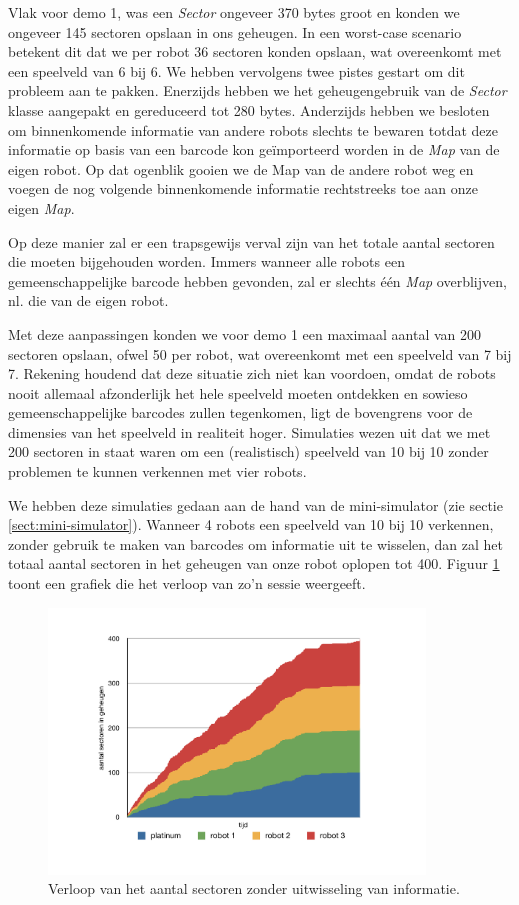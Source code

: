 \documentclass[12pt,a4paper]{report}
\begin{document}
Vlak voor demo 1, was een \emph{Sector} ongeveer 370 bytes groot en konden we ongeveer 145 sectoren opslaan in ons geheugen. In een worst-case scenario betekent dit dat we per robot 36 sectoren konden opslaan, wat overeenkomt met een speelveld van 6 bij 6. We hebben vervolgens twee pistes gestart om dit probleem aan te pakken. Enerzijds hebben we het geheugengebruik van de \emph{Sector} klasse aangepakt en gereduceerd tot 280 bytes. Anderzijds hebben we besloten om binnenkomende informatie van andere robots slechts te bewaren totdat deze informatie op basis van een barcode kon ge\"importeerd worden in de \emph{Map} van de eigen robot. Op dat ogenblik gooien we de Map van de andere robot weg en voegen de nog volgende binnenkomende informatie rechtstreeks toe aan onze eigen \emph{Map}.

Op deze manier zal er een trapsgewijs verval zijn van het totale aantal sectoren die moeten bijgehouden worden. Immers wanneer alle robots een gemeenschappelijke barcode hebben gevonden, zal er slechts \'e\'en \emph{Map} overblijven, nl. die van de eigen robot.

Met deze aanpassingen konden we voor demo 1 een maximaal aantal van 200 sectoren opslaan, ofwel 50 per robot, wat overeenkomt met een speelveld van 7 bij 7. Rekening houdend dat deze situatie zich niet kan voordoen, omdat de robots nooit allemaal afzonderlijk het hele speelveld moeten ontdekken en sowieso gemeenschappelijke barcodes zullen tegenkomen, ligt de bovengrens voor de dimensies van het speelveld in realiteit hoger. Simulaties wezen uit dat we met 200 sectoren in staat waren om een (realistisch) speelveld van 10 bij 10 zonder problemen te kunnen verkennen met vier robots.

We hebben deze simulaties gedaan aan de hand van de mini-simulator (zie sectie \ref{sect:mini-simulator}). Wanneer 4 robots een speelveld van 10 bij 10 verkennen, zonder gebruik te maken van barcodes om informatie uit te wisselen, dan zal het totaal aantal sectoren in het geheugen van onze robot oplopen tot 400. Figuur \ref{chart:sectors-no-merge} toont een grafiek die het verloop van zo'n sessie weergeeft.

\begin{figure}[htbp]
  \centering
  \includegraphics[width=100mm]{resources/sectors-no-merge.pdf}
  \caption{Verloop van het aantal sectoren zonder uitwisseling van informatie.}
  \label{chart:sectors-no-merge}
\end{figure}
\end{document}

